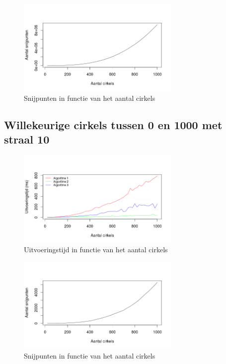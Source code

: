 \documentclass[11pt,a4paper]{article}
\begin{document}
\begin{figure}[H]
\centering
\includegraphics[width=0.7\textwidth]{snijpunten_10.png}
\caption*{Snijpunten in functie van het aantal cirkels}
\end{figure}

\subsection{Willekeurige cirkels tussen 0 en 1000 met straal 10}
\begin{figure}[H]
\centering
\includegraphics[width=0.7\textwidth]{uitvoeringstijd_100.png}
\caption*{Uitvoeringstijd in functie van het aantal cirkels}
\end{figure}

\begin{figure}[H]
\centering
\includegraphics[width=0.7\textwidth]{snijpunten_100.png}
\caption*{Snijpunten in functie van het aantal cirkels}
\end{figure}
\end{document}
